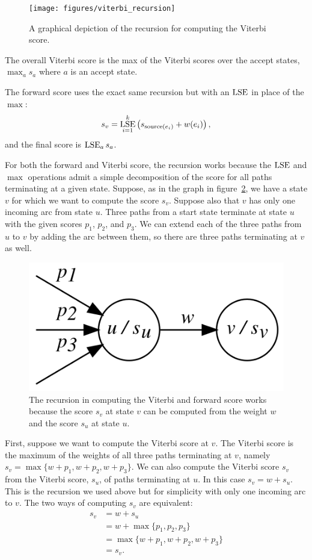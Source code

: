 \begin{figure}
    \centering
    \texttt{[image: figures/viterbi\_recursion]}
    \caption{A graphical depiction of the recursion for computing the Viterbi
    score.}
    \label{fig:viterbi_recursion}
\end{figure}

The overall Viterbi score is the max of the Viterbi scores over the accept
states, $\max_a s_a$ where $a$ is an accept state.

The forward score uses the exact same recursion but with an $\operatorname*{\textrm{LSE}}$ in place of
the $\max$:
$$
s_v = \operatorname*{\textrm{LSE}}_{i=1}^k \left( s_{\textrm{source}(e_i)} + w(e_i) \right),
$$
and the final score is $\operatorname*{\textrm{LSE}}_a s_a$.

For both the forward and Viterbi score, the recursion works because the $\operatorname*{\textrm{LSE}}$
and $\max$ operations admit a simple decomposition of the score for all paths
terminating at a given state. Suppose, as in the graph in
figure~\ref{fig:dp_recursion}, we have a state $v$ for which we want to compute
the score $s_v$. Suppose also that $v$ has only one incoming arc from state
$u$. Three paths from a start state terminate at state $u$ with the given
scores $p_1$, $p_2$, and $p_3$. We can extend each of the three paths from $u$
to $v$ by adding the arc between them, so there are three paths terminating at
$v$ as well.

\begin{figure}
    \centering
    \includegraphics[scale=\dotscale]{figures/dp_recursion}
    \caption{The recursion in computing the Viterbi and forward score works
    because the score $s_v$ at state $v$ can be computed from the weight $w$
    and the score $s_u$ at state $u$.}
    \label{fig:dp_recursion}
\end{figure}

First, suppose we want to compute the Viterbi score at $v$. The Viterbi score
is the maximum of the weights of all three paths terminating at $v$, namely
$s_v = \max \{w + p_1, w + p_2, w + p_3\}$. We can also compute the Viterbi
score $s_v$ from the Viterbi score, $s_u$, of paths terminating at $u$. In this
case $s_v = w + s_u$. This is the recursion we used above but for simplicity
with only one incoming arc to $v$. The two ways of computing $s_v$ are
equivalent:
\begin{align*}
s_v &= w + s_u \\
    &= w + \max \{p_1, p_2, p_3 \} \\
    &= \max \{w + p_1, w + p_2, w + p_3\} \\
    &= s_v.
\end{align*}

